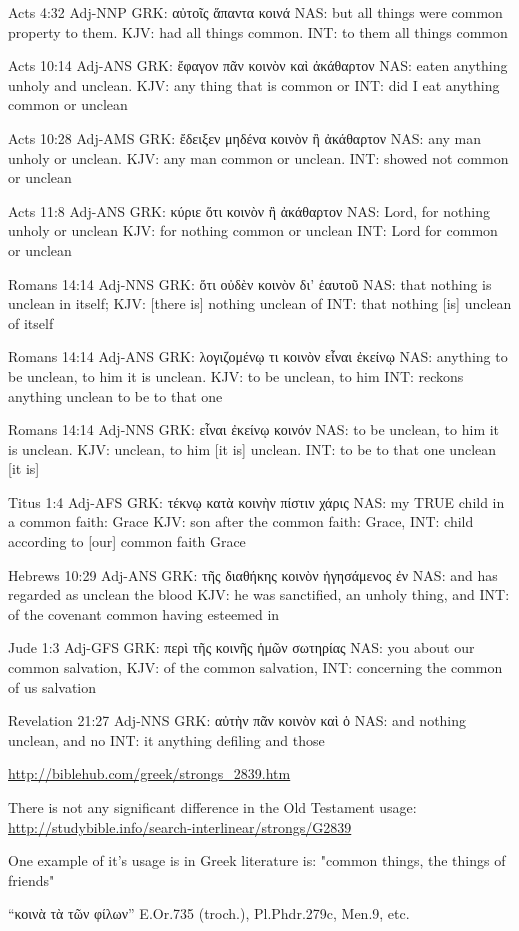 \documentclass[11pt]{article}
\begin{document}
\begin{thebibliography}{37}
\begin{greek}
Acts 4:32 Adj-NNP
GRK: αὐτοῖς ἅπαντα κοινά 
NAS: but all things were common property to them.
KJV: had all things common.
INT: to them all things common

Acts 10:14 Adj-ANS
GRK: ἔφαγον πᾶν κοινὸν καὶ ἀκάθαρτον
NAS: eaten anything unholy and unclean.
KJV: any thing that is common or
INT: did I eat anything common or unclean

Acts 10:28 Adj-AMS
GRK: ἔδειξεν μηδένα κοινὸν ἢ ἀκάθαρτον
NAS: any man unholy or unclean.
KJV: any man common or unclean.
INT: showed not common or unclean

Acts 11:8 Adj-ANS
GRK: κύριε ὅτι κοινὸν ἢ ἀκάθαρτον
NAS: Lord, for nothing unholy or unclean
KJV: for nothing common or unclean
INT: Lord for common or unclean

Romans 14:14 Adj-NNS
GRK: ὅτι οὐδὲν κοινὸν δι' ἑαυτοῦ
NAS: that nothing is unclean in itself;
KJV: [there is] nothing unclean of
INT: that nothing [is] unclean of itself

Romans 14:14 Adj-ANS
GRK: λογιζομένῳ τι κοινὸν εἶναι ἐκείνῳ
NAS: anything to be unclean, to him it is unclean.
KJV: to be unclean, to him
INT: reckons anything unclean to be to that one

Romans 14:14 Adj-NNS
GRK: εἶναι ἐκείνῳ κοινόν 
NAS: to be unclean, to him it is unclean.
KJV: unclean, to him [it is] unclean.
INT: to be to that one unclean [it is]

Titus 1:4 Adj-AFS
GRK: τέκνῳ κατὰ κοινὴν πίστιν χάρις
NAS: my TRUE child in a common faith: Grace
KJV: son after the common faith: Grace,
INT: child according to [our] common faith Grace

Hebrews 10:29 Adj-ANS
GRK: τῆς διαθήκης κοινὸν ἡγησάμενος ἐν
NAS: and has regarded as unclean the blood
KJV: he was sanctified, an unholy thing, and
INT: of the covenant common having esteemed in

Jude 1:3 Adj-GFS
GRK: περὶ τῆς κοινῆς ἡμῶν σωτηρίας
NAS: you about our common salvation,
KJV: of the common salvation,
INT: concerning the common of us salvation

Revelation 21:27 Adj-NNS
GRK: αὐτὴν πᾶν κοινὸν καὶ ὁ
NAS: and nothing unclean, and no
INT: it anything defiling and those
\end{greek}
\url{http://biblehub.com/greek/strongs_2839.htm}

There is not any significant difference in the Old Testament usage:
\url{http://studybible.info/search-interlinear/strongs/G2839}


One example of it's usage is in Greek literature is:
"common things, the things of friends"
\begin{greek}
“κοινὰ τὰ τῶν φίλων” E.Or.735 (troch.), Pl.Phdr.279c, Men.9, etc.


\end{greek}
\end{thebibliography}
\end{document}
